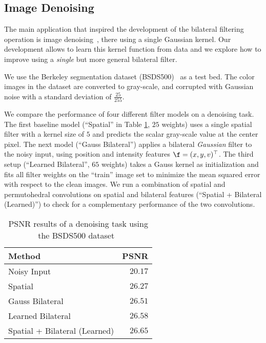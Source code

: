 \subsection{Image Denoising}

The main application that inspired the development of the bilateral
filtering operation is image denoising~\cite{aurich1995non}, there
using a single Gaussian kernel. Our development allows to learn this
kernel function from data and we explore how to improve using a \emph{single}
but more general bilateral filter.

We use the Berkeley segmentation dataset
(BSDS500)~\cite{arbelaezi2011bsds500} as a test bed. The color
images in the dataset are converted to gray-scale,
and corrupted with Gaussian noise with a standard deviation of
$\frac {25} {255}$.

We compare the performance of four different filter models on a
denoising task.
The first baseline model (``Spatial'' in Table \ref{tab:denoising}, $25$
weights) uses a single spatial filter with a kernel size of
$5$ and predicts the scalar gray-scale value at the center pixel. The next model
(``Gauss Bilateral'') applies a bilateral \emph{Gaussian}
filter to the noisy input, using position and intensity features $\f=(x,y,v)^\top$.
The third setup (``Learned Bilateral'', $65$ weights)
takes a Gauss kernel as initialization and
fits all filter weights on the ``train'' image set to minimize the
mean squared error with respect to the clean images.
We run a combination
of spatial and permutohedral convolutions on spatial and bilateral
features (``Spatial + Bilateral (Learned)'') to check for a complementary
performance of the two convolutions.

\label{sec:exp:denoising}
\begin{table}[!h]
\begin{center}
  \footnotesize
  \begin{tabular}[t]{lr}
    \toprule
    Method & PSNR \\
    \midrule
    Noisy Input & $20.17$ \\
    Spatial & $26.27$ \\
    Gauss Bilateral & $26.51$ \\
    Learned Bilateral & $26.58$ \\
    Spatial + Bilateral (Learned) & $26.65$ \\
    \bottomrule
  \end{tabular}
\end{center}
\vspace{-0.5em}
\caption{PSNR results of a denoising task using the BSDS500
  dataset~\cite{arbelaezi2011bsds500}}
\vspace{-0.5em}
\label{tab:denoising}
\end{table}

